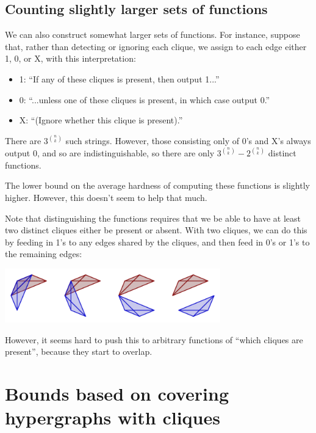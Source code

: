 \documentclass[12pt]{article}
\theoremstyle{definition}
\begin{document}
\subsection{Counting slightly larger sets of functions}

We can also construct somewhat larger sets of functions. For instance,
suppose that, rather than detecting or ignoring each clique, we assign
to each edge either 1, 0, or X, with this interpretation:

\begin{itemize}

\item 1: ``If any of these cliques is present, then output 1...''

\item 0: ``...unless one of these cliques is present, in which case output 0.''

\item X: ``(Ignore whether this clique is present).''

\end{itemize}

There are $3^{n \choose k}$ such strings. However, those consisting only of
0's and X's always output 0, and so are indistinguishable, so there are
only $3^{n \choose k} - 2^{n \choose k}$ distinct functions.

The lower bound on the average hardness of computing these functions is
slightly higher. However, this doesn't seem to help that much.

Note that distinguishing the functions requires that we be able to have at
least two distinct cliques either be present or absent. With two cliques,
we can do this by feeding in 1's to any edges shared by the cliques, and
then feed in 0's or 1's to the remaining edges:

\includegraphics[width=0.7\textwidth]{R/overlapping.pdf}

However, it seems hard to push this to arbitrary functions of ``which cliques are
present'', because they start to overlap.

\section{Bounds based on covering hypergraphs with cliques}
\end{document}
